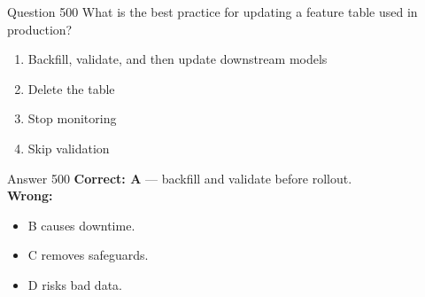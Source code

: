 \documentclass[aspectratio=169,11pt]{beamer}
\begin{document}
	\begin{frame}{Question 500}
		What is the best practice for updating a feature table used in production?
		\begin{enumerate}[label=\Alph*.]
			\item Backfill, validate, and then update downstream models
			\item Delete the table
			\item Stop monitoring
			\item Skip validation
		\end{enumerate}
	\end{frame}
	\begin{frame}{Answer 500}
		\textbf{Correct: A} --- backfill and validate before rollout.\\
		\vspace{0.5em}
		\textbf{Wrong:}
		\begin{itemize}
			\item B causes downtime.
			\item C removes safeguards.
			\item D risks bad data.
		\end{itemize}
	\end{frame}
	
\end{document}
